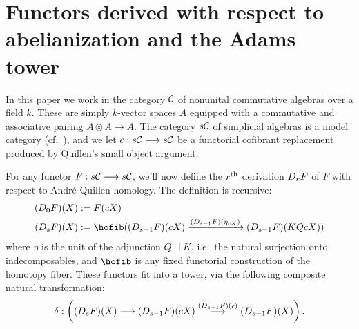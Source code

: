 \documentclass[11pt]{amsart}
\theoremstyle{plain}
\newcommand{\dupdown}[2]{D_{\smash{#1}}}
\begin{document}
\section{Functors derived with respect to abelianization and the Adams tower}\label{sec:derWRTab}
In this paper we work in the category $\mathcal{C}$ of nonunital commutative algebras over a field $k$. These are simply $k$-vector spaces $A$ equipped with a commutative and associative pairing $A\otimes A\to A$. The category $s\mathcal{C}$ of simplicial algebras is a model category (cf.\ \cite{QuillenHomAlg.pdf}), and we let $c:s\mathcal{C}\longrightarrow s\mathcal{C}$ be a functorial cofibrant replacement produced by Quillen's small object argument.




For any functor $F:s\mathcal{C}\longrightarrow s\mathcal{C}$, we'll now define the $r^\textup{th}$ derivation $\dupdown{r}{b}F$ of $F$ with respect to Andr\'e-Quillen homology. The definition is recursive:
\begin{alignat*}{2}
(\dupdown{0}{b}F)(X)
&:=
F(cX)%
\\
(\dupdown{s}{b}F)(X)
&:=
\hofib((\dupdown{s-1}{c}F)(cX)\xrightarrow{(\dupdown{s-1}{c}F)(\eta_{cX})} (\dupdown{s-1}{c}F)(KQcX))
\end{alignat*}
where $\eta$ is the unit of the adjunction $Q\dashv K$, i.e.\ the natural surjection onto indecomposables, and $\hofib$ is any fixed  functorial construction of the homotopy fiber. These functors fit into a tower, via the following composite natural transformation:
\[\delta:\left((\dupdown{s}{c}F)(X)\to (\dupdown{s-1}{c}F)(cX)\overset{(\dupdown{s-1}{c}F)(\epsilon)}{\to} (\dupdown{s-1}{c}F)(X)\right).\]
\end{document}

